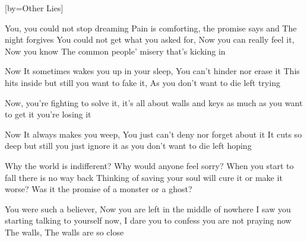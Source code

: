 [by={Other Lies}]

  \chordsoff
  \beginverse
  You, you could not stop dreaming
  Pain is comforting, the promise says and The night forgives 
  You could not get what you asked for,
  Now you can really feel it, Now you know
  The common people’ misery that’s kicking in
  \endverse
  
  \beginchorus
  Now It sometimes wakes you up in your sleep,
  You can’t hinder nor erase it 
  This hits inside but still you want to fake it,
  As you don’t want to die left trying

  Now, you’re fighting to solve it,
  it’s all about walls and keys
  as much as you want to get it you’re losing it 
  \endchorus
  
  \beginverse
  Now It always makes you weep,
  You just can’t deny nor forget about it 
  It cuts so deep but still you just ignore it
  as you don’t want to die left hoping 
  \endverse
  
  \beginverse
  Why the world is indifferent?
  Why would anyone feel sorry?
  When you start to fall there is no way back
  Thinking of saving your soul will cure it or make it worse?
  Was it the promise of a monster or a ghost?
  \endverse
  
  \beginchorus
  You were such a believer,
  Now you are left in the middle of nowhere
  I saw you starting talking to yourself now,
  I dare you to confess you are not praying now
  The walls, The walls are so close
  \endchorus
\endsong
  
